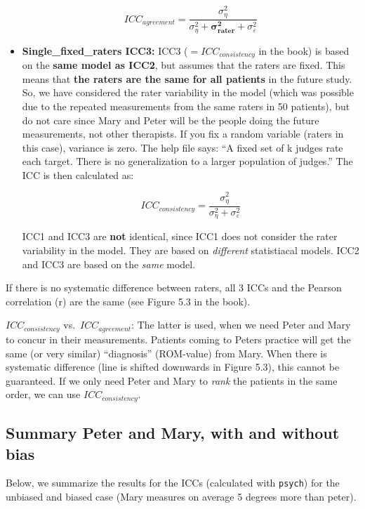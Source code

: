 \documentclass[
]{book}
\begin{document}
\begin{itemize}
  \[ICC_{agreement} = \frac{\sigma_{\eta}^2}{\sigma_{\eta}^2 +\mathbf{\sigma_{rater}^2} + \sigma_{\varepsilon}^2}\]
\item
  \textbf{Single\_fixed\_raters ICC3:}
  ICC3 (\(=ICC_{consistency}\) in the book) is based on the \textbf{same model as ICC2},
  but assumes that the raters are fixed.
  This means that \textbf{the raters are the same for all patients} in the future study.
  So, we have considered the rater variability in the model
  (which was possible due to the repeated measurements from the same raters in 50 patients),
  but do not care since Mary and Peter will be the people doing the future
  measurements, not other therapists. If you fix a random variable
  (raters in this case), variance is zero. The help file says:
  ``A fixed set of k judges rate each target.
  There is no generalization to a larger population of judges.''
  The ICC is then calculated as:

  \[ICC_{consistency} = \frac{\sigma_{\eta}^2}{\sigma_{\eta}^2 + \sigma_{\varepsilon}^2}\]

  ICC1 and ICC3 are \textbf{not} identical, since ICC1 does not consider the rater variability
  in the model. They are based on \emph{different} statistiacal models.
  ICC2 and ICC3 are based on the \emph{same} model.
\end{itemize}

If there is no systematic difference between raters, all 3 ICCs and the Pearson
correlation (r) are the same (see Figure 5.3 in the book).

\(ICC_{consistency}\) vs.~\(ICC_{agreement}\):
The latter is used, when we need Peter and Mary to concur in their measurements.
Patients coming to Peters practice will get the same (or very similar) ``diagnosis'' (ROM-value)
from Mary. When there is systematic difference (line is shifted downwards in Figure 5.3),
this cannot be guaranteed.
If we only need Peter and Mary to \emph{rank} the patients in the same order,
we can use \(ICC_{consistency}\).

\subsection{Summary Peter and Mary, with and without bias}\label{summary-peter-and-mary-with-and-without-bias}

Below, we summarize the results for the ICCs (calculated with \texttt{psych})
for the unbiased and biased case (Mary measures on average 5 degrees more than peter).
\end{document}
